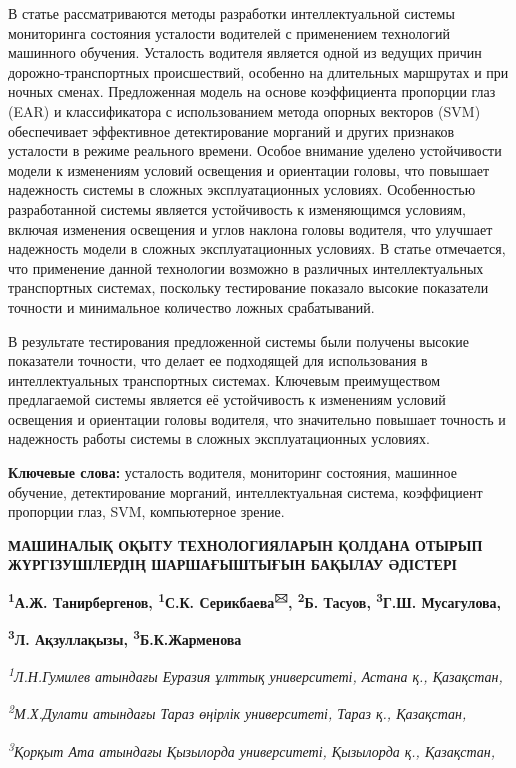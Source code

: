 \documentclass[
]{article}
\begin{document}
В статье рассматриваются методы разработки интеллектуальной системы
мониторинга состояния усталости водителей с применением технологий
машинного обучения. Усталость водителя является одной из ведущих причин
дорожно-транспортных происшествий, особенно на длительных маршрутах и
при ночных сменах. Предложенная модель на основе коэффициента пропорции
глаз (EAR) и классификатора с использованием метода опорных векторов
(SVM) обеспечивает эффективное детектирование морганий и других
признаков усталости в режиме реального времени. Особое внимание уделено
устойчивости модели к изменениям условий освещения и ориентации головы,
что повышает надежность системы в сложных эксплуатационных условиях.
Особенностью разработанной системы является устойчивость к изменяющимся
условиям, включая изменения освещения и углов наклона головы водителя,
что улучшает надежность модели в сложных эксплуатационных условиях. В
статье отмечается, что применение данной технологии возможно в различных
интеллектуальных транспортных системах, поскольку тестирование показало
высокие показатели точности и минимальное количество ложных
срабатываний.

В результате тестирования предложенной системы были получены высокие
показатели точности, что делает ее подходящей для использования в
интеллектуальных транспортных системах. Ключевым преимуществом
предлагаемой системы является её устойчивость к изменениям условий
освещения и ориентации головы водителя, что значительно повышает
точность и надежность работы системы в сложных эксплуатационных
условиях.

\textbf{Ключевые слова:} усталость водителя, мониторинг состояния,
машинное обучение, детектирование морганий, интеллектуальная система,
коэффициент пропорции глаз, SVM, компьютерное зрение.

\textbf{МАШИНАЛЫҚ ОҚЫТУ ТЕХНОЛОГИЯЛАРЫН ҚОЛДАНА ОТЫРЫП ЖҮРГІЗУШІЛЕРДІҢ
ШАРШАҒЫШТЫҒЫН БАҚЫЛАУ ӘДІСТЕРІ}

\textbf{\textsuperscript{1}А.Ж. Танирбергенов, \textsuperscript{1}С.К.
Серикбаева\textsuperscript{🖂}, \textsuperscript{2}Б. Тасуов,
\textsuperscript{3}Г.Ш. Мусагулова,}

\textbf{\textsuperscript{3}Л. Ақзуллақызы,
\textsuperscript{3}Б.К.Жарменова}

\emph{\textsuperscript{1}Л.Н.Гумилев атындағы Еуразия ұлттық
университеті, Астана қ., Қазақстан,}

\emph{\textsuperscript{2}М.Х.Дулати атындағы Тараз өңірлік университеті,
Тараз қ., Қазақстан,}

\emph{\textsuperscript{3}Қорқыт Ата атындағы Қызылорда университеті,
Қызылорда қ., Қазақстан,}
\end{document}
